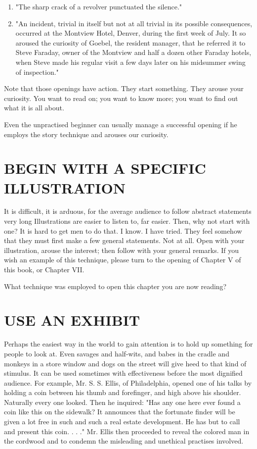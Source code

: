 \documentclass[10pt]{article}
\begin{document}
\begin{enumerate}
  \item "The sharp crack of a revolver punctuated the silence."
  \item "An incident, trivial in itself but not at all trivial in its possible consequences, occurred at the Montview Hotel, Denver, during the first week of July. It so aroused the curiosity of Goebel, the resident manager, that he referred it to Steve Faraday, owner of the Montview and half a dozen other Faraday hotels, when Steve made his regular visit a few days later on his midsummer swing of inspection."
\end{enumerate}

Note that those openings have action. They start something. They arouse your curiosity. You want to read on; you want to know more; you want to find out what it is all about.

Even the unpractised beginner can usually manage a successful opening if he employs the story technique and arouses our curiosity.

\section*{BEGIN WITH A SPECIFIC ILLUSTRATION}
It is difficult, it is arduous, for the average audience to follow abstract statements very long Illustrations are easier to listen to, far easier. Then, why not start with one? It is hard to get men to do that. I know. I have tried. They feel somehow that they must first make a few general statements. Not at all. Open with your illustration, arouse the interest; then follow with your general remarks. If you wish an example of this technique, please turn to the opening of Chapter V of this book, or Chapter VII.

What technique was employed to open this chapter you are now reading?

\section*{USE AN EXHIBIT}
Perhaps the easiest way in the world to gain attention is to hold up something for people to look at. Even savages and half-wits, and babes in the cradle and monkeys in a store window and dogs on the street will give heed to that kind of stimulus. It can be used sometimes with effectiveness before the most dignified audience. For example, Mr. S. S. Ellis, of Philadelphia, opened one of his talks by holding a coin between his thumb and forefinger, and high above his shoulder. Naturally every one looked. Then he inquired: "Has any one here ever found a coin like this on the sidewalk? It announces that the fortunate finder will be given a lot free in such and such a real estate development. He has but to call and present this coin. . . ." Mr. Ellis then proceeded to reveal the colored man in the cordwood and to condemn the misleading and unethical practises involved.
\end{document}
